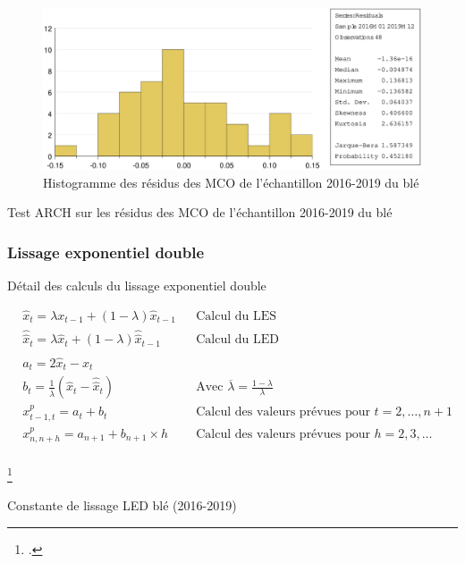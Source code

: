 \documentclass[12pt,a4paper]{article}
\begin{document}
\begin{figure}[H]
    \centering
    \includegraphics[width=\textwidth]{annexe/3_1_extra_hist_ble19.eps}
    \caption{Histogramme des résidus des MCO de l'échantillon 2016-2019 du blé}
    \label{fig:extra_hist_ble19}
\end{figure}

\begin{table}[H]
    \centering
    \caption{Test ARCH sur les résidus des MCO de l'échantillon 2016-2019 du blé}
    \label{tab:extra_arch_ble19}
    \sffamily
    
\end{table}
\subsubsection{Lissage exponentiel double}\label{appendix:led_19}
\begin{table}[H]
    \caption[led]{Détail des calculs du lissage exponentiel double\footnotemark }
    \label{tab:led}
    \begin{align*}
        &\hat{x}_{t} = \lambda x_{t-1} + (1 - \lambda)\hat{x}_{t-1} & &\text{Calcul du LES}\\
        &\hat{\hat{x}}_{t} = \lambda \hat{x}_{t} + (1 - \lambda)\hat{\hat{x}}_{t-1} & &\text{Calcul du LED}\\
        &a_{t} = 2\hat{x}_t - \hat{\hat{x}}_{t} & & \\
        &b_{t} = \frac{1}{\overline{\lambda}} (\hat{x}_{t} - \hat{\hat{x}}_{t}) & &\text{Avec  } \overline{\lambda}= \frac{1-\lambda}{\lambda}\\
        &x_{t-1, t}^{p} = a_{t} + b_{t} & & \text{Calcul des valeurs prévues pour $t=2,\dots,n+1$}\\
        &x_{n, n+h}^{p} = a_{n+1} + b_{n+1} \times h & & \text{Calcul des valeurs prévues pour $h=2,3,\dots$}\\
    \end{align*}
\end{table}
\footcitetext{terraza}
\begin{table}[H]
    \centering
    \caption{Constante de lissage LED blé (2016-2019)}
    \label{tab:led_ble19}
    \sffamily
    
\end{table}
\end{document}
